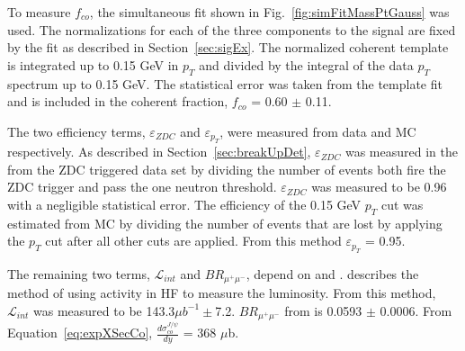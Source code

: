   To measure $f_{co}$, the simultaneous fit shown in 
    Fig.~\ref{fig:simFitMassPtGauss} was used.
  The normalizations for each of the three components to the signal are fixed 
  by the fit as described in Section~\ref{sec:sigEx}.
  The normalized coherent template is integrated up to 0.15 GeV in $p_{T}$ and
    divided by the integral of the data $p_{T}$ spectrum up to 0.15 GeV.
  The statistical error was taken from the template fit and is included in the
    coherent fraction, $f_{co}$ = 0.60 $\pm$ 0.11.

  The two efficiency terms, $\varepsilon_{ZDC}$ and $\varepsilon_{p_{T}}$, were
    measured from data and MC respectively.
  As described in Section~\ref{sec:breakUpDet}, $\varepsilon_{ZDC}$ was 
    measured in the from the ZDC triggered data set by dividing the number of 
    events both fire the ZDC trigger and pass the one neutron threshold.
  $\varepsilon_{ZDC}$ was measured to be 0.96 with a negligible statistical 
    error.
  The efficiency of the 0.15 GeV $p_{T}$ cut was estimated from MC by dividing 
    the number of events that are lost by applying the $p_{T}$ cut after all
    other cuts are applied. 
  From this method $\varepsilon_{p_{T}}$ = 0.95.
  
  The remaining two terms, $\mathcal{L}_{int}$ and $BR_{\mu^{+}\mu^{-}}$, 
    depend on \cite{cmsLumi} and \cite{pdg}.
  \cite{cmsLumi} describes the method of using activity in HF to measure 
    the luminosity. 
  From this method, $\mathcal{L}_{int}$ was measured to be 143.3$\mu b^{-1}\pm$7.2.
  $BR_{\mu^{+}\mu^{-}}$ from \cite{pdg} is 0.0593 $\pm$ 0.0006.
  From Equation~\ref{eq:expXSecCo}, $\frac{d\sigma^{J/\psi}_{co}}{dy}$ = 368 $\mu$b.

